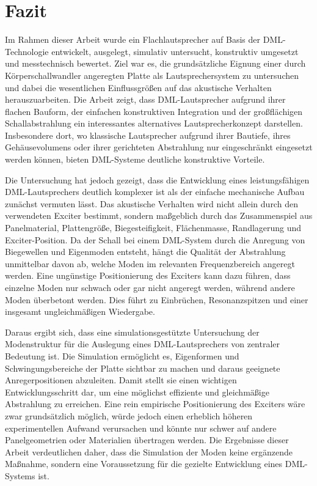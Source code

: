 \chapter{Fazit}

Im Rahmen dieser Arbeit wurde ein Flachlautsprecher auf Basis der DML-Technologie entwickelt, ausgelegt, simulativ untersucht, konstruktiv umgesetzt und messtechnisch bewertet. Ziel war es, die grundsätzliche Eignung einer durch Körperschallwandler angeregten Platte als Lautsprechersystem zu untersuchen und dabei die wesentlichen Einflussgrößen auf das akustische Verhalten herauszuarbeiten. Die Arbeit zeigt, dass DML-Lautsprecher aufgrund ihrer flachen Bauform, der einfachen konstruktiven Integration und der großflächigen Schallabstrahlung ein interessantes alternatives Lautsprecherkonzept darstellen. Insbesondere dort, wo klassische Lautsprecher aufgrund ihrer Bautiefe, ihres Gehäusevolumens oder ihrer gerichteten Abstrahlung nur eingeschränkt eingesetzt werden können, bieten DML-Systeme deutliche konstruktive Vorteile.

Die Untersuchung hat jedoch gezeigt, dass die Entwicklung eines leistungsfähigen DML-Lautsprechers deutlich komplexer ist als der einfache mechanische Aufbau zunächst vermuten lässt. Das akustische Verhalten wird nicht allein durch den verwendeten Exciter bestimmt, sondern maßgeblich durch das Zusammenspiel aus Panelmaterial, Plattengröße, Biegesteifigkeit, Flächenmasse, Randlagerung und Exciter-Position. Da der Schall bei einem DML-System durch die Anregung von Biegewellen und Eigenmoden entsteht, hängt die Qualität der Abstrahlung unmittelbar davon ab, welche Moden im relevanten Frequenzbereich angeregt werden. Eine ungünstige Positionierung des Exciters kann dazu führen, dass einzelne Moden nur schwach oder gar nicht angeregt werden, während andere Moden überbetont werden. Dies führt zu Einbrüchen, Resonanzspitzen und einer insgesamt ungleichmäßigen Wiedergabe.

Daraus ergibt sich, dass eine simulationsgestützte Untersuchung der Modenstruktur für die Auslegung eines DML-Lautsprechers von zentraler Bedeutung ist. Die Simulation ermöglicht es, Eigenformen und Schwingungsbereiche der Platte sichtbar zu machen und daraus geeignete Anregerpositionen abzuleiten. Damit stellt sie einen wichtigen Entwicklungsschritt dar, um eine möglichst effiziente und gleichmäßige Abstrahlung zu erreichen. Eine rein empirische Positionierung des Exciters wäre zwar grundsätzlich möglich, würde jedoch einen erheblich höheren experimentellen Aufwand verursachen und könnte nur schwer auf andere Panelgeometrien oder Materialien übertragen werden. Die Ergebnisse dieser Arbeit verdeutlichen daher, dass die Simulation der Moden keine ergänzende Maßnahme, sondern eine Voraussetzung für die gezielte Entwicklung eines DML-Systems ist.


